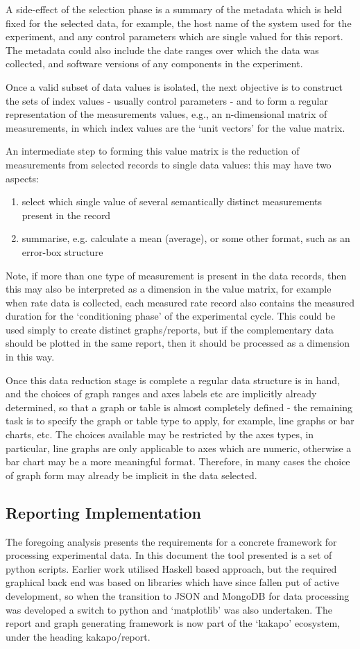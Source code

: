 A side-effect of the selection phase is a summary of the metadata which is held fixed for the selected data, for example, the host name of the system used for the experiment, and any control parameters which are single valued for this report.  The metadata could also include the date ranges over which the data was collected, and software versions of any components in the experiment.


Once a valid subset of data values is isolated, the next objective is to construct the sets of index values - usually control parameters - and to form a regular representation of the measurements values, e.g., an n-dimensional matrix of measurements, in which index values are the `unit vectors' for the value matrix.

An intermediate step to forming this value matrix is the reduction of measurements from selected records to single data values: this may have two aspects:
\begin{enumerate}
    \item select which single value of several semantically distinct measurements present in the record
    \item summarise, e.g. calculate a mean (average), or some other format, such as an error-box structure
\end{enumerate}

Note, if more than one type of measurement is present in the data records, then this may also be interpreted as a dimension in the value matrix, for example when rate data is collected, each measured rate record also contains the measured duration for the `conditioning phase' of the experimental cycle. This could be used simply to create distinct graphs/reports, but if the complementary data should be plotted in the same report, then it should be processed as a dimension in this way.


Once this data reduction stage is complete a regular data structure is in hand, and the choices of graph ranges and axes labels etc are implicitly already determined, so that a graph or table is almost completely defined - the remaining task is to specify the graph or table type to apply, for example, line graphs or bar charts, etc.  The choices available may be restricted by the axes types, in particular, line graphs are only applicable to axes which are numeric, otherwise a bar chart may be a more meaningful format.
Therefore, in many cases the choice of graph form may already be implicit in the data selected.

\subsection{Reporting Implementation}
The foregoing analysis presents the requirements for a concrete framework for processing experimental data.  In this document the tool presented is a set of python scripts.  Earlier work utilised Haskell based approach, but the required graphical back end was based on libraries which have since fallen put of active development, so when the transition to JSON and MongoDB for data processing was developed a switch to python and `matplotlib' was also undertaken.  The report and graph generating framework is now part of the `kakapo' ecosystem, under the heading kakapo/report.

